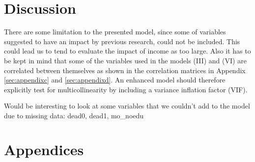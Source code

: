 \documentclass[a4paper, 11pt]{article} %
\begin{document}
\section{Discussion}
There are some limitation to the presented model, since some of variables suggested to have an impact by previous research, could not be included. This could lead us to tend to evaluate the impact of income as too large. Also it has to be kept in mind that some of the variables used in the models (III) and (VI) are correlated between themselves as shown in the correlation matrices in Appendix \ref{sec:appendixc} and \ref{sec:appendixd}. An enhanced model should therefore explicitly test for multicollinearity by including a variance inflation factor (VIF). 

Would be interesting to look at some variables that we couldn't add to the model due to missing data: dead0, dead1, mo\_noedu


\newpage




\newpage
\section*{Appendices}
\appendix
\end{document}
